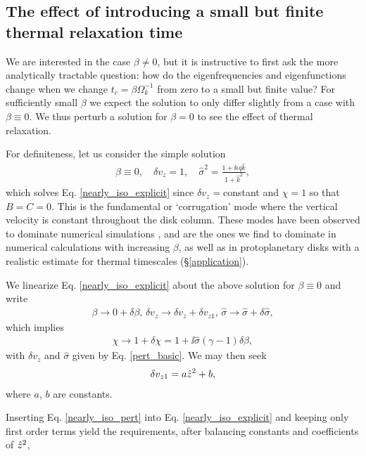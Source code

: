 \subsection{The effect of introducing a small but finite
  thermal relaxation time}\label{relax_pert}
We are interested in the case $\beta\neq 0$, but it is instructive to
first ask  the more analytically tractable question: how 
do the eigenfrequencies and eigenfunctions change when we change
$t_c=\beta\Omega_k^{-1}$ from zero to a small but finite value? For 
sufficiently small $\beta$ %
we expect the solution to only differ slightly from a case with
$\beta\equiv 0$. We thus perturb a solution for $\beta=0$ to see the
effect of thermal relaxation.  

For definiteness, let us consider the simple solution 
\begin{align}
  \beta\equiv 0, \quad \delta v_z = 1,\quad \hat{\sigma}^2 = \frac{1 +
  \ii\epsilon q \hat{k}}{1+\hat{k}^2}, \label{pert_basic} 
\end{align}
which solves Eq. \ref{nearly_iso_explicit} since $\delta
v_z=$constant and $\chi=1$ so that $B=C=0$. 
This is the fundamental or `corrugation' mode where the vertical
velocity is constant throughout the disk column. These modes have been
observed to dominate numerical simulations \citep{nelson13,stoll14},  
and are the ones we find to dominate in numerical calculations with 
increasing $\beta$, as well as in protoplanetary disks 
with a realistic estimate for thermal timescales
(\S\ref{application}).  %

We linearize Eq. \ref{nearly_iso_explicit} about the above
solution for $\beta\equiv0$ and write 
\begin{align}\label{nearly_iso_pert}
  \beta \to 0 + \delta\beta,\, \delta v_z\to \delta v_z+\delta
  v_{z1},\,\hat{\sigma} \to \hat{\sigma} + \delta\hat{\sigma}, 
\end{align}
which implies 
\begin{align}
  \chi \to 1 + \delta\chi = 1 + \ii \hat{\sigma}\left(\gamma-1\right)\delta\beta,
\end{align}
with $\delta v_z$ and $\hat{\sigma}$ given by Eq. \ref{pert_basic}. We
may then seek  
\begin{align}
  \delta v_{z1} = a \hat{z}^2 + b,
\end{align}
where $a$, $b$ are constants. 

Inserting Eq. \ref{nearly_iso_pert} into Eq. \ref{nearly_iso_explicit}
and keeping only first order terms yield the requirements, after
balancing constants and coefficients of $\hat{z}^2$, 

